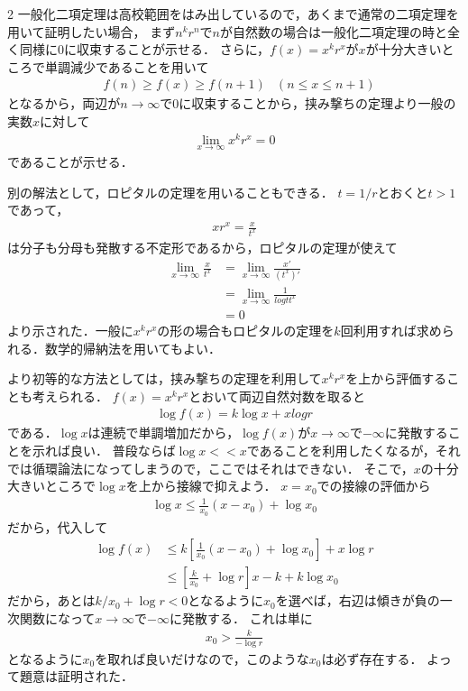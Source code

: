 \documentclass[../../main.tex]{subfiles}
\begin{document}
\begin{multicols}{2}
  一般化二項定理は高校範囲をはみ出しているので，あくまで通常の二項定理を用いて証明したい場合，
  まず$n^{k}r^{n}$で$n$が自然数の場合は一般化二項定理の時と全く同様に$0$に収束することが示せる．
  さらに，$f(x)=x^{k}r^x$が$x$が十分大きいところで単調減少であることを用いて
  \begin{align*}
     & f(n) \ge f(x) \ge f(n+1) & (n\le x \le n+1)
  \end{align*}
  となるから，両辺が$n\to\infty$で$0$に収束することから，挟み撃ちの定理より一般の実数$x$に対して
  \begin{align*}
    \lim_{x\to\infty} x^{k}r^{x} = 0
  \end{align*}
  であることが示せる．

  別の解法として，ロピタルの定理を用いることもできる．
  $t=1/r$とおくと$t>1$であって，
  \begin{align*}
    xr^{x} = \frac{x}{t^{x}}
  \end{align*}
  は分子も分母も発散する不定形であるから，ロピタルの定理が使えて
  \begin{align*}
    \lim_{x\to\infty}\frac{x}{t^{x}}
     & = \lim_{x\to\infty}\frac{x'}{(t^{x})'}   \\
     & = \lim_{x\to\infty}\frac{1}{log t t^{x}} \\
     & = 0
  \end{align*}
  より示された．一般に$x^{k}r^{x}$の形の場合もロピタルの定理を$k$回利用すれば求められる．数学的帰納法を用いてもよい．

  より初等的な方法としては，挟み撃ちの定理を利用して$x^{k}r^{x}$を上から評価することも考えられる．
  $f(x) = x^{k}r^{x}$とおいて両辺自然対数を取ると
  \begin{align*}
    \log f(x) = k\log x + x log r
  \end{align*}
  である．$\log x$は連続で単調増加だから，$\log f(x)$が$x\to\infty$で$-\infty$に発散することを示れば良い．
  普段ならば$\log x << x$であることを利用したくなるが，それでは循環論法になってしまうので，ここではそれはできない．
  そこで，$x$の十分大きいところで$\log x$を上から接線で抑えよう．
  $x=x_0$での接線の評価から
  \begin{align*}
    \log x \le \frac{1}{x_0}\left(x-x_0\right) + \log x_0
  \end{align*}
  だから，代入して
  \begin{align*}
    \log f(x)
     & \le k\left[\frac{1}{x_0}\left(x-x_0\right) + \log x_0 \right] + x \log r \\
     & \le \left[\frac{k}{x_0}+ \log r\right] x - k + k\log x_0
  \end{align*}
  だから，あとは$k/x_0 + \log r < 0$となるように$x_0$を選べば，右辺は傾きが負の一次関数になって$x\to\infty$で$-\infty$に発散する．
  これは単に
  \begin{align*}
    x_0 > \frac{k}{- \log r}
  \end{align*}
  となるように$x_0$を取れば良いだけなので，このような$x_0$は必ず存在する．
  よって題意は証明された．


\end{multicols}
\end{document}
